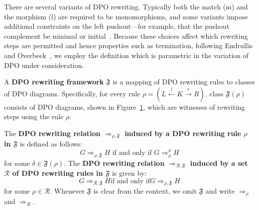 There are several variants of DPO rewriting. Typically both the match (m) and the morphism (l) are required to be monomorphisms, and some variants impose additional constraints on the left pushout—for example, that the pushout complement be minimal or initial~\cite{braatz2011delete,behr2021concurrency,behr2023fundamentals}. Because these choices affect which rewriting steps are permitted and hence properties such as termination, following Endrullis and Overbeek~\cite{endrullis2024generalized_icgt}, we employ the definition which is parametric in the variation of DPO under consideration.
\begin{definition}
  \label{def:rewriting_framework} 
    A \textbf{DPO rewriting framework} $\mathfrak{F}$ is a mapping of DPO rewriting rules to classes of DPO diagrams. Specifically, for every rule \( \rho = (L \overset{l}{\leftarrow} K \overset{r}{\rightarrow} R) \), class $\mathfrak{F}(\rho)$ consists of DPO diagrams, shown in Figure~\ref{fig:preliminaries:a_rewriting_framework}, which are witnesses of rewriting steps using the rule \( \rho \).
 \begin{figure}[H]
      \centering
        \caption{}
        \label{fig:preliminaries:a_rewriting_framework}
\end{figure}
    The \textbf{DPO rewriting relation $\Rightarrow_{\rho,\mathfrak{F}}$ induced by a DPO rewriting rule $\rho$ in $\mathfrak{F}$} is defined as follows:
     $$G \Rightarrow_{\rho,\mathfrak{F}} H\text{ if and only if }G \Rightarrow_\rho^\delta H$$
    for some $\delta \in \mathfrak{F}(\rho)$. 
     The \textbf{DPO rewriting relation $\Rightarrow_{\mathcal{R},\mathfrak{F}}$ induced by a set $\mathcal{R}$ of DPO rewriting rules in $\mathfrak{F}$} is given by: 
     $$G \Rightarrow_{\mathcal{R},\mathfrak{F}} H \text{if and only if} G \Rightarrow_{\rho,\mathfrak{F}} H$$ for some $\rho \in \mathcal{R}$. Whenever $\mathfrak{F}$ is clear from the context, we 
    omit $\mathfrak{F}$ and 
    write $\Rightarrow_{\rho}$ and $\Rightarrow_{\mathcal{R}}$.
  \end{definition}
